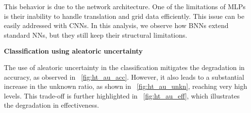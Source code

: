 This behavior is due to the network architecture. One of the limitations of MLPs is their inability to handle translation and grid data efficiently. This issue can be easily addressed with CNNs. In this analysis, we observe how BNNs extend standard NNs, but they still keep their structural limitations.

\vspace{0.3cm}
\textbf{Classification using aleatoric uncertainty}
\vspace{0.1cm}

The use of aleatoric uncertainty in the classification mitigates the degradation in accuracy, as observed in \Fig~\ref{fig:ht_au_acc}. However, it also leads to a substantial increase in the unknown ratio, as shown in \Fig~\ref{fig:ht_au_unkn}, reaching very high levels. This trade-off is further highlighted in \Fig~\ref{fig:ht_au_eff}, which illustrates the degradation in effectiveness.

